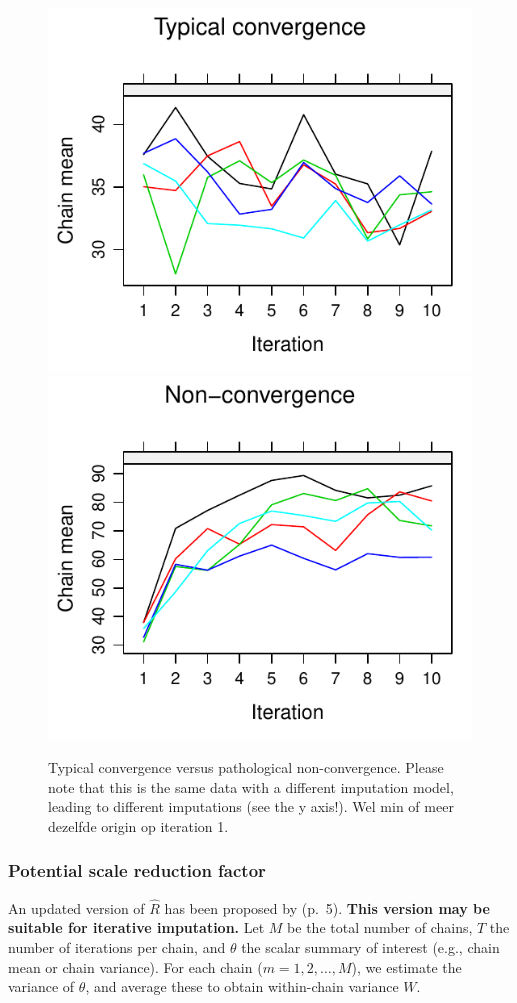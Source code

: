 \documentclass[Royal,times,sageh]{sagej}
\begin{document}
\begin{figure}

{\centering \includegraphics[width=.49\linewidth]{manuscript_files/figure-latex/non-conv-1} \includegraphics[width=.49\linewidth]{manuscript_files/figure-latex/non-conv-2} 

}

\caption{Typical convergence versus pathological non-convergence. Please note that this is the same data with a different imputation model, leading to different imputations (see the y axis!). Wel min of meer dezelfde origin op iteration 1.}\label{fig:non-conv}
\end{figure}

\hypertarget{potential-scale-reduction-factor}{%
\subsubsection{Potential scale reduction
factor}\label{potential-scale-reduction-factor}}

An updated version of \(\widehat{R}\) has been proposed by
\citet{veht19} (p.~5). \textbf{This version may be suitable for
iterative imputation.} Let \(M\) be the total number of chains, \(T\)
the number of iterations per chain, and \(\theta\) the scalar summary of
interest (e.g., chain mean or chain variance). For each chain
(\(m = 1, 2, \dots, M\)), we estimate the variance of \(\theta\), and
average these to obtain within-chain variance \(W\).
\end{document}
